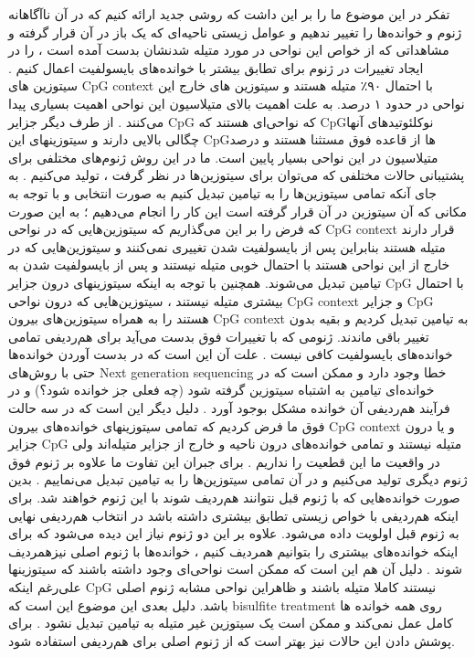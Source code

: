 تفکر در این موضوع ما را بر این داشت که روشی جدید ارائه کنیم که در آن ناآگاهانه ژنوم و خوانده‌ها را تغییر ندهیم و عوامل زیستی ناحیه‌ای که یک باز در آن قرار گرفته و مشاهداتی که از خواص این نواحی در مورد متیله شدنشان بدست آمده است  ، را در ایجاد تغییرات در ژنوم برای تطابق بیشتر با خوانده‌های بایسولفیت اعمال کنیم .
سیتوزین های CpG context با احتمال ۹۰٪ متیله هستند و سیتوزین های خارج این نواحی در حدود ۱ درصد. به علت اهمیت بالای متیلاسیون این نواحی اهمیت بسیاری پیدا می‌کنند . از طرف دیگر جزایر CpG که نواحی‌ای هستند که  CpGنوکلئوتیدهای آنها چگالی بالایی دارند و سیتوزینهای این CpGها  از قاعده فوق مستثنا هستند و درصد متیلاسیون در این نواحی بسیار پایین است. 
ما در این روش ژنوم‌های مختلفی برای پشتیبانی حالات مختلفی که می‌توان برای سیتوزین‌ها در نظر گرفت ، تولید می‌کنیم . به جای آنکه تمامی سیتوزین‌ها را به تیامین تبدیل کنیم به صورت انتخابی و با توجه به مکانی که آن سیتوزین در آن قرار گرفته است این کار را انجام می‌دهیم ؛ به این صورت که فرض را بر این می‌گذاریم که سیتوزین‌هایی که در نواحی CpG context قرار دارند متیله هستند بنابراین پس از بایسولفیت شدن تغییری نمی‌کنند و سیتوزین‌هایی که در خارج از این نواحی هستند با احتمال خوبی متیله نیستند و پس از بایسولفیت شدن به تیامین تبدیل می‌شوند. همچنین با توجه به اینکه سیتوزینهای درون جزایر CpG با احتمال بیشتری متیله نیستند ، سیتوزین‌هایی که درون نواحی CpG context و جزایر CpG هستند را به همراه سیتوزین‌های بیرون CpG context به تیامین تبدیل کردیم و بقیه بدون تغییر باقی ماندند.
ژنومی که با تغییرات فوق بدست می‌آید برای هم‌ردیفی تمامی خوانده‌های بایسولفیت کافی نیست . علت آن این است که در بدست آوردن خوانده‌ها حتی با روش‌های Next generation sequencing خطا وجود دارد و ممکن است که در خوانده‌ای تیامین به اشتباه سیتوزین گرفته شود (چه فعلی جز خوانده شود؟) و در فرآیند هم‌ردیفی آن خوانده مشکل بوجود آورد . دلیل دیگر این است که در سه حالت فوق ما فرض کردیم که تمامی سیتوزینهای خوانده‌های بیرون CpG context و یا درون جزایر CpG متیله نیستند و تمامی خوانده‌های درون ناحیه و خارج از جزایر متیله‌اند ولی در واقعیت ما این قطعیت را نداریم . برای جبران این تفاوت ما علاوه بر ژنوم فوق ژنوم دیگری تولید می‌کنیم و در آن تمامی سیتوزین‌ها را به تیامین تبدیل می‌نماییم . بدین صورت خوانده‌هایی که با ژنوم قبل نتوانند هم‌ردیف شوند با این ژنوم خواهند شد. برای اینکه هم‌ردیفی با خواص زیستی تطابق بیشتری داشته باشد در انتخاب هم‌ردیفی نهایی به ژنوم قبل اولویت داده می‌شود. 
علاوه بر این دو ژنوم نیاز این دیده می‌شود که برای اینکه خوانده‌های بیشتری را بتوانیم همردیف کنیم ، خوانده‌ها با ژنوم اصلی نیزهمردیف شوند . دلیل آن هم این است که ممکن است نواحی‌ای وجود داشته باشند که سیتوزینها علی‌رغم اینکه CpG نیستند کاملا متیله باشند و ظاهراین نواحی مشابه ژنوم اصلی باشد. دلیل بعدی این موضوع این است که bisulfite treatment روی همه خوانده ها کامل عمل نمی‌کند و ممکن است یک سیتوزین غیر متیله به تیامین تبدیل نشود . برای پوشش دادن این حالات نیز بهتر است که از ژنوم اصلی برای هم‌ردیفی استفاده شود.
